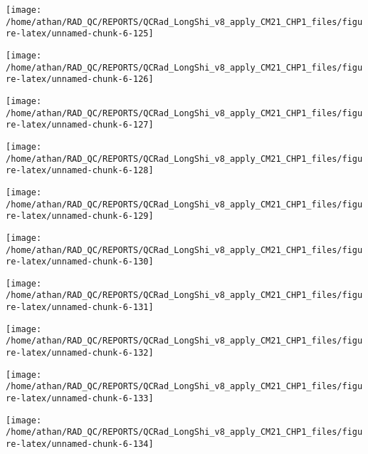 \documentclass[
  10pt,
  a4paper,oneside]{article}
\begin{document}
\begin{center}\texttt{[image: /home/athan/RAD\_QC/REPORTS/QCRad\_LongShi\_v8\_apply\_CM21\_CHP1\_files/figure-latex/unnamed-chunk-6-125]} \end{center}

\begin{center}\texttt{[image: /home/athan/RAD\_QC/REPORTS/QCRad\_LongShi\_v8\_apply\_CM21\_CHP1\_files/figure-latex/unnamed-chunk-6-126]} \end{center}

\begin{center}\texttt{[image: /home/athan/RAD\_QC/REPORTS/QCRad\_LongShi\_v8\_apply\_CM21\_CHP1\_files/figure-latex/unnamed-chunk-6-127]} \end{center}

\begin{center}\texttt{[image: /home/athan/RAD\_QC/REPORTS/QCRad\_LongShi\_v8\_apply\_CM21\_CHP1\_files/figure-latex/unnamed-chunk-6-128]} \end{center}

\begin{center}\texttt{[image: /home/athan/RAD\_QC/REPORTS/QCRad\_LongShi\_v8\_apply\_CM21\_CHP1\_files/figure-latex/unnamed-chunk-6-129]} \end{center}

\begin{center}\texttt{[image: /home/athan/RAD\_QC/REPORTS/QCRad\_LongShi\_v8\_apply\_CM21\_CHP1\_files/figure-latex/unnamed-chunk-6-130]} \end{center}

\begin{center}\texttt{[image: /home/athan/RAD\_QC/REPORTS/QCRad\_LongShi\_v8\_apply\_CM21\_CHP1\_files/figure-latex/unnamed-chunk-6-131]} \end{center}

\begin{center}\texttt{[image: /home/athan/RAD\_QC/REPORTS/QCRad\_LongShi\_v8\_apply\_CM21\_CHP1\_files/figure-latex/unnamed-chunk-6-132]} \end{center}

\begin{center}\texttt{[image: /home/athan/RAD\_QC/REPORTS/QCRad\_LongShi\_v8\_apply\_CM21\_CHP1\_files/figure-latex/unnamed-chunk-6-133]} \end{center}

\begin{center}\texttt{[image: /home/athan/RAD\_QC/REPORTS/QCRad\_LongShi\_v8\_apply\_CM21\_CHP1\_files/figure-latex/unnamed-chunk-6-134]} \end{center}
\end{document}
